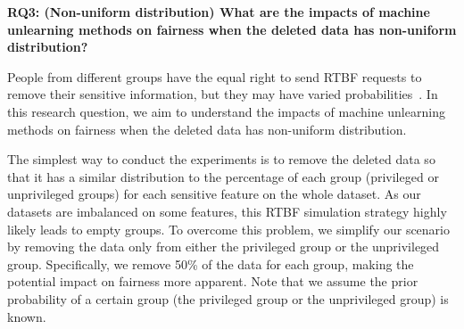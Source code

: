 \begin{flushleft}
\textbf{RQ3: (Non-uniform distribution) What are the impacts of machine unlearning methods on fairness when the deleted data has non-uniform distribution?}
\end{flushleft}



People from different groups have the equal right to send RTBF requests to remove their sensitive information, but they may have varied probabilities~\cite{eurobarometer}. In this research question, we aim to understand the impacts of machine unlearning methods on fairness when the deleted data has non-uniform distribution. 



The simplest way to conduct the experiments is to remove the deleted data so that it has a similar distribution to the percentage of each group (privileged or unprivileged groups) for each sensitive feature on the whole dataset. As our datasets are imbalanced on some features, this RTBF simulation strategy highly likely leads to empty groups. To overcome this problem, we simplify our scenario by removing the data only from either the privileged group or the unprivileged group. Specifically, we remove 50\% of the data for each group, making the potential impact on fairness more apparent. Note that we assume the prior probability of a certain group (the privileged group or the unprivileged group) is known.




